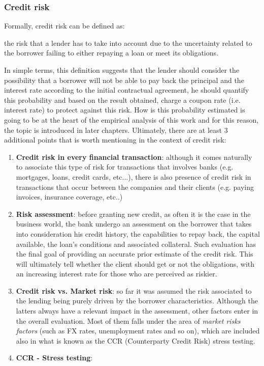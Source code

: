 \documentclass[a4paper,12pt]{article}
\begin{document}
    \subsubsection{Credit risk}

        Formally, credit risk can be defined as:
        \begin{definition}
            the risk that a lender has to take into account due to the uncertainty related to the borrower failing to either repaying a loan or meet its obligations.
        \end{definition}

        In simple terms, this definition suggests that the lender should consider the possibility that a borrower will not be able to pay back the principal and the 
        interest rate according to the initial contractual agreement, he should quantify this probability and based on the result obtained, charge a coupon rate 
        (i.e. interest rate) to protect against this risk. How is this probability estimated is going to be at the heart of the empirical analysis of this work and 
        for this reason, the topic is introduced in later chapters. Ultimately, there are at least 3 additional points that is worth mentioning in the context of credit
        risk: 
        
        \begin{enumerate}
            \item \textbf{Credit risk in every financial transaction}: although it comes naturally to associate this type of risk for transactions that involves banks (e.g. mortgages, loans, credit cards, etc...), there is also presence of credit risk in transactions that occur between the companies and their clients (e.g. paying invoices, insurance coverage, etc..)  
            \item \textbf{Risk assessment}: before granting new credit, as often it is the case in the business world, the bank undergo an assessment on the borrower that takes into consideration his credit history, the capabilities to repay back, the capital available, the loan's conditions and associated collateral. Such evaluation has the final goal of providing an accurate prior estimate of the credit risk. This will ultimately tell whether the client should get or not the obligations, with an increasing interest rate for those who are perceived as riskier.
            \item \textbf{Credit risk vs. Market risk}: so far it was assumed the risk associated to the lending being purely driven by the borrower characteristics. Although the latters always have a relevant impact in the assessment, other factors enter in the overall evaluation. Most of them falls under the area of \textit{market risks factors} (such as FX rates, unemployment rates and so on), which are included also in what is known as the CCR (Counterparty Credit Risk) stress testing.
            \item \textbf{CCR - Stress testing}:  
        \end{enumerate}
        
\end{document}
